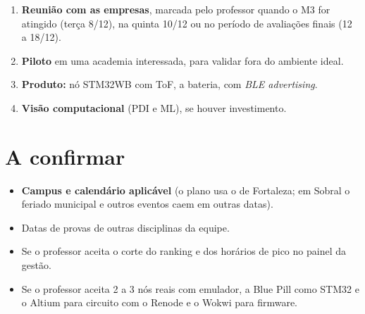 \documentclass[11pt,a4paper]{article}
\begin{document}
\begin{enumerate}
  \item \textbf{Reunião com as empresas}, marcada pelo professor quando o M3 for atingido (terça 8/12), na quinta 10/12 ou no período de avaliações finais (12 a 18/12).
  \item \textbf{Piloto} em uma academia interessada, para validar fora do ambiente ideal.
  \item \textbf{Produto:} nó STM32WB com ToF, a bateria, com \emph{BLE advertising}.
  \item \textbf{Visão computacional} (PDI e ML), se houver investimento.
\end{enumerate}

\section{A confirmar}

\begin{itemize}
  \item \textbf{Campus e calendário aplicável} (o plano usa o de Fortaleza; em Sobral o feriado municipal e outros eventos caem em outras datas).
  \item Datas de provas de outras disciplinas da equipe.
  \item Se o professor aceita o corte do ranking e dos horários de pico no painel da gestão.
  \item Se o professor aceita 2 a 3 nós reais com emulador, a Blue Pill como STM32 e o Altium para circuito com o Renode e o Wokwi para firmware.
\end{itemize}
\end{document}
